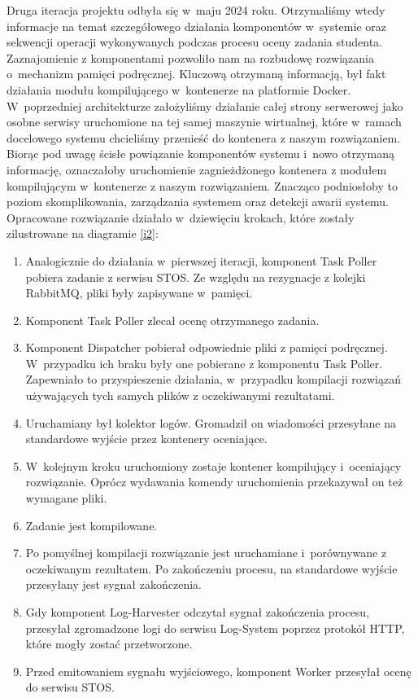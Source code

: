 \newline \indent Druga iteracja projektu odbyła się w~maju 2024 roku. Otrzymaliśmy wtedy informacje na temat szczegółowego działania komponentów w~systemie oraz sekwencji operacji wykonywanych podczas procesu oceny zadania studenta. Zaznajomienie z komponentami pozwoliło nam na rozbudowę rozwiązania o~mechanizm pamięci podręcznej. Kluczową otrzymaną informacją, był fakt działania modułu kompilującego w~kontenerze na platformie Docker. W~poprzedniej architekturze założyliśmy działanie całej strony serwerowej jako osobne serwisy uruchomione na tej samej maszynie wirtualnej, które w~ramach docelowego systemu chcieliśmy przenieść do kontenera z naszym rozwiązaniem. Biorąc pod uwagę ścisłe powiązanie komponentów systemu i~nowo otrzymaną informację, oznaczałoby uruchomienie zagnieżdżonego kontenera z modułem kompilującym w~kontenerze z naszym rozwiązaniem. Znacząco podniosłoby to poziom skomplikowania, zarządzania systemem oraz detekcji awarii systemu. Opracowane rozwiązanie działało w~dziewięciu krokach, które zostały zilustrowane na diagramie \ref{i2}:
\begin{enumerate}
	\item Analogicznie do działania w~pierwszej iteracji, komponent Task Poller pobiera zadanie z serwisu STOS. Ze względu na rezygnacje z kolejki RabbitMQ, pliki były zapisywane w~pamięci.
	\item Komponent Task Poller zlecał ocenę otrzymanego zadania.
	\item Komponent Dispatcher pobierał odpowiednie pliki z pamięci podręcznej. W~przypadku ich braku były one pobierane z komponentu Task Poller. Zapewniało to przyspieszenie działania, w~przypadku kompilacji rozwiązań używających tych samych plików z oczekiwanymi rezultatami.
	\item Uruchamiany był kolektor logów. Gromadził on wiadomości przesyłane na standardowe wyjście przez kontenery oceniające.
	\item W~kolejnym kroku uruchomiony zostaje kontener kompilujący i~oceniający rozwiązanie. Oprócz wydawania komendy uruchomienia przekazywał on też wymagane pliki.
	\item Zadanie jest kompilowane.
	\item Po pomyślnej kompilacji rozwiązanie jest uruchamiane i~porównywane z oczekiwanym rezultatem. Po zakończeniu procesu, na standardowe wyjście przesyłany jest sygnał zakończenia.
	\item Gdy komponent Log-Harvester odczytał sygnał zakończenia procesu, przesyłał zgromadzone logi do serwisu Log-System poprzez protokół HTTP, które mogły zostać przetworzone.
	\item Przed emitowaniem sygnału wyjściowego, komponent Worker przesyłał ocenę do serwisu STOS.
\end{enumerate}
